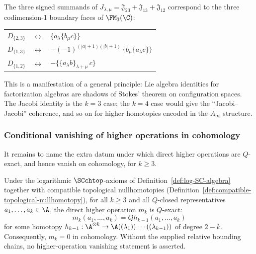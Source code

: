 \begin{remark}
The three signed summands of
\(J_{\lambda,\mu}=\mathfrak J_{23}+\mathfrak J_{13}+\mathfrak J_{12}\)
correspond to the three codimension-1 boundary faces of $\FM_3(\C)$:
\begin{center}
\begin{tabular}{lcl}
$D_{\{2,3\}}$ & $\longleftrightarrow$ & $\{a_\lambda \{b_\mu c\}\}$ \\
$D_{\{1,3\}}$ & $\longleftrightarrow$ & $-(-1)^{(|a|+1)(|b|+1)}\,\{b_\mu \{a_\lambda c\}\}$ \\
$D_{\{1,2\}}$ & $\longleftrightarrow$ & $-\{\{a_\lambda b\}_{\lambda+\mu}\, c\}$
\end{tabular}
\end{center}
This is a manifestation of a general principle: Lie algebra identities for factorization algebras are shadows of Stokes' theorem on configuration spaces. The Jacobi identity is the $k=3$ case; the $k=4$ case would give the ``Jacobi--Jacobi'' coherence, and so on for higher homotopies encoded in the $A_\infty$ structure.
\end{remark}

\subsubsection{Conditional vanishing of higher operations in cohomology}

It remains to name the extra datum under which direct higher
operations are \(Q\)-exact, and hence vanish on cohomology, for
\(k\ge3\).

\begin{theorem}[Higher operations are \(Q\)-exact under compatible topological
nullhomotopies; \ClaimStatusConditional; licensing $\gamma+\varepsilon$
via the logarithmic chain/pro ambient $\hypAmbientPro$, the relative
compactified ordered topological factor, compatible topological
nullhomotopies in
Definition~\textup{\ref{def:compatible-topological-nullhomotopy}}, and
the factorisation
\(\widetilde\omega_k=\omega_k^{\mathrm{hol}}\wedge\omega_k^{\mathrm{top}}\)]
Under the logarithmic $\SCchtop$-axioms of
Definition~\ref{def:log-SC-algebra} together with compatible topological
nullhomotopies (Definition~\ref{def:compatible-topological-nullhomotopy}),
for all $k \geq 3$ and all \(Q\)-closed representatives
\(a_1,\ldots,a_k\in\A\), the direct higher operation \(m_k\) is
$Q$-exact:
\[
m_k(a_1,\ldots,a_k)=Qh_{k-1}(a_1,\ldots,a_k)
\]
for some homotopy $h_{k-1} : \A^{\otimes k} \to \A((\lambda_1)) \cdots ((\lambda_{k-1}))$ of degree $2-k$. Consequently, $m_k = 0$ in cohomology.
Without the supplied relative bounding chains, no higher-operation
vanishing statement is asserted.
\end{theorem}

